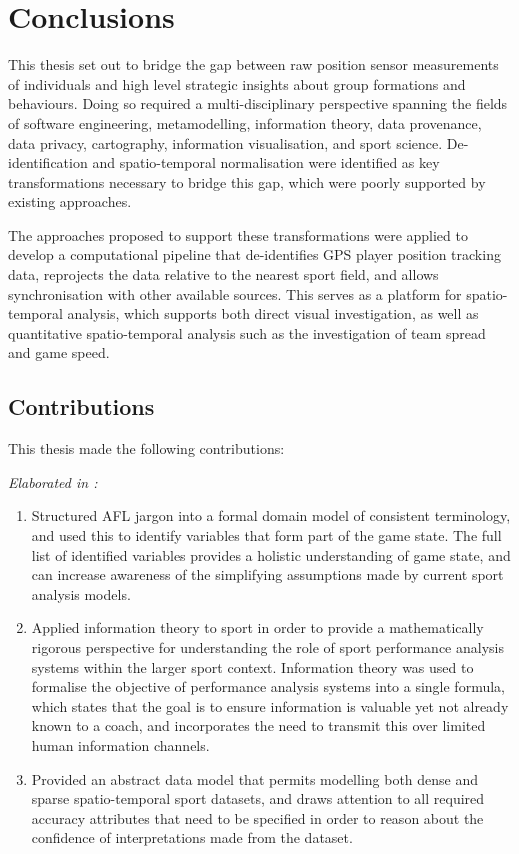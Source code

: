 \chapter{Conclusions}
\label{ch:conclusions}
\startchapter

This thesis set out to bridge the gap between raw position sensor measurements of individuals and high level strategic insights about group formations and behaviours. Doing so required a multi-disciplinary perspective spanning the fields of software engineering, metamodelling, information theory, data provenance, data privacy, cartography, information visualisation, and sport science. De-identification and spatio-temporal normalisation were identified as key transformations necessary to bridge this gap, which were poorly supported by existing approaches.

The approaches proposed to support these transformations were applied to develop a computational pipeline that de-identifies GPS player position tracking data, reprojects the data relative to the nearest sport field, and allows synchronisation with other available sources. This serves as a platform for spatio-temporal analysis, which supports both direct visual investigation, as well as quantitative spatio-temporal analysis such as the investigation of team spread and game speed.

\pagebreak{}

\section{Contributions} \label{sec:conclusions-contributions}

This thesis made the following contributions:


\textit{Elaborated in :}
\begin{enumerate}
  \item Structured AFL jargon into a formal domain model of consistent terminology, and used this to identify variables that form part of the game state. The full list of identified variables provides a holistic understanding of game state, and can increase awareness of the simplifying assumptions made by current sport analysis models.
  \item Applied information theory to sport in order to provide a mathematically rigorous perspective for understanding the role of sport performance analysis systems within the larger sport context. Information theory was used to formalise the objective of performance analysis systems into a single formula, which states that the goal is to ensure information is valuable yet not already known to a coach, and incorporates the need to transmit this over limited human information channels.
  \item Provided an abstract data model that permits modelling both dense and sparse spatio-temporal sport datasets, and draws attention to all required accuracy attributes that need to be specified in order to reason about the confidence of interpretations made from the dataset.
  \setcounter{contribnum}{\value{enumi}}
\end{enumerate}

